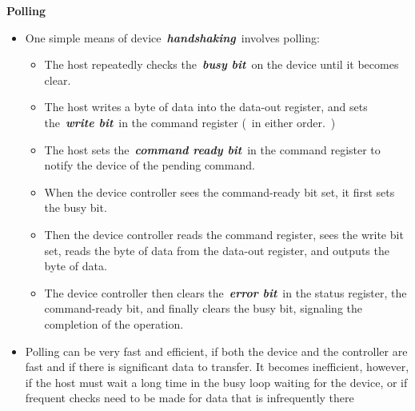 \documentclass[12pt]{article}
\begin{document}

\par

{\fontsize{18pt}{21.6pt}\selectfont \textbf{Polling}\par}\par

\begin{itemize}
	\item One simple means of device \textbf{\textit{handshaking}} involves polling:\par

\begin{itemize}
	\item The host repeatedly checks the \textbf{\textit{busy bit}} on the device until it becomes clear.\par

	\item The host writes a byte of data into the data-out register, and sets the \textbf{\textit{write bit}} in the command register ( in either order. )\par

	\item The host sets the \textbf{\textit{command ready bit}} in the command register to notify the device of the pending command.\par

	\item When the device controller sees the command-ready bit set, it first sets the busy bit.\par

	\item Then the device controller reads the command register, sees the write bit set, reads the byte of data from the data-out register, and outputs the byte of data.\par

	\item The device controller then clears the \textbf{\textit{error bit}} in the status register, the command-ready bit, and finally clears the busy bit, signaling the completion of the operation.\par


\end{itemize}
	\item Polling can be very fast and efficient, if both the device and the controller are fast and if there is significant data to transfer. It becomes inefficient, however, if the host must wait a long time in the busy loop waiting for the device, or if frequent checks need to be made for data that is infrequently there
\end{itemize}\par
\end{document}
